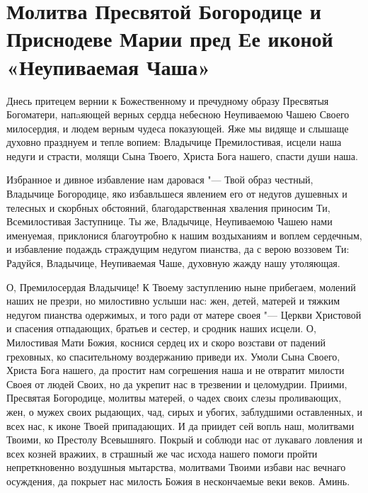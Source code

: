 \mychapterending


\section{Молитва Пресвятой Богородице и Приснодеве Марии пред  Ее иконой «Неупиваемая Чаша»}\begin{mymulticols}


Днесь притецем вернии к Божественному и пречудному образу Пресвятыя Богоматери, напaяющей верных сердца небесною Неупиваемою Чашею Своего милосердия, и людем верным чудеса показующей. Яже мы видяще и слышаще духовно празднуем и тепле вопием: Владычице Премилостивая, исцели наша недуги и страсти, молящи Сына Твоего, Христа Бога нашего, спасти души наша.


Избранное и дивное избавление нам даровася "--- Твой образ честный, Владычице Богородице, яко избавльшеся явлением его от недугов душевных и телесных и скорбных обстояний, благодарственная хваления приносим Ти, Всемилостивая Заступнице. Ты же, Владычице, Неупиваемою Чашею нами именуемая, приклонися благоутробно к нашим воздыханиям и воплем сердечным, и избавление подаждь страждущим недугом пианства, да с верою воззовем Ти: Радуйся, Владычице, Неупиваемая Чаше, духовную жажду нашу утоляющая.


О, Премилосердая Владычице! К Твоему заступлению ныне прибегаем, молений наших не презри, но милостивно услыши нас: жен, детей, матерей и тяжким недугом пианства одержимых, и того ради от матере своея "--- Церкви Христовой и спасения отпадающих, братьев и сестер, и сродник наших исцели. О, Милостивая Мати Божия, коснися сердец их и скоро возстави от падений греховных, ко спасительному воздержанию приведи их. Умоли Сына Своего, Христа Бога нашего, да простит нам согрешения наша и не отвратит милости Своея от людей Своих, но да укрепит нас в трезвении и целомудрии. Приими, Пресвятая Богородице, молитвы матерей, о чадех своих слезы проливающих, жен, о мужех своих рыдающих, чад, сирых и убогих, заблудшими оставленных, и всех нас, к иконе Твоей припадающих. И да приидет сей вопль наш, молитвами Твоими, ко Престолу Всевышняго. Покрый и соблюди нас от лукаваго ловления и всех козней вражиих, в страшный же час исхода нашего помоги пройти непреткновенно воздушныя мытарства, молитвами Твоими избави нас вечнаго осуждения, да покрыет нас милость Божия в нескончаемые веки веков. Аминь.

\end{mymulticols}

